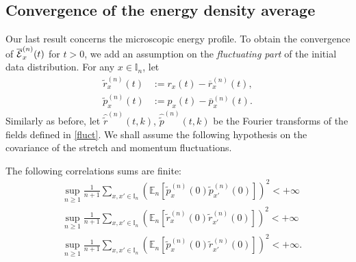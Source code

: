 \documentclass[EJP]{ejpecp} %
\newcommand\bbE{{\mathbb E}}
\newcommand\T{{\mathbb I}}
\renewcommand{\ge}{\geqslant}
\renewcommand{\tilde}{\widetilde}
\renewcommand{\bar}{\overline}
\numberwithin{equation}{section}
\begin{document}
\subsection{Convergence of the  energy density  average}
\label{sec:macr-equat}
Our last result concerns the microscopic energy profile. 
 To obtain the  convergence of $\bar{\cal
  E}_x^{(n)}(t)$ for $t>0$, we add an assumption on the
\emph{fluctuating part} of the initial data distribution.
For any $x \in \T_n$, let
\begin{equation}
\label{fluct}
\begin{aligned} \tilde r_x^{(n)}(t) &:= r_x(t)-\bar r_x^{(n)}(t),\\  \tilde p_x^{(n)}(t) &:= p_x(t)-\bar p_x^{(n)}(t).\end{aligned}
\end{equation}
Similarly as before, let  $\widehat{\tilde
  r}^{(n)}(t,k)$, $\widehat{\tilde p}^{(n)}(t,k)$ be the Fourier
transforms of the fields defined in \eqref{fluct}.
We shall assume the following hypothesis on the covariance
of the stretch and momentum fluctuations.
\begin{assumption} \label{ass3}The following correlations sums are finite:
\begin{equation}
\label{2-mfluct}
\begin{split} & \sup_{n\ge 1}\frac 1{n+1} 
\sum_{x,x'\in\T_n}\left(\mathbb E_n\left[ \tilde p_x^{(n)}(0)
  \tilde p_{x'}^{(n)}(0)\right] \right)^2   <+\infty\\
  &
\sup_{n\ge 1}\frac 1{n+1} 
\sum_{x,x'\in\T_n}\left(\mathbb E_n\left[ \tilde r_x^{(n)}(0)
  \tilde r_{x'}^{(n)}(0)\right] \right)^2  <+\infty \\
  & \sup_{n\ge 1}\frac 1{n+1} 
\sum_{x,x'\in\T_n} \left(\mathbb E_n\left[ \tilde p_x^{(n)}(0)
  \tilde r_{x'}^{(n)}(0)\right] \right)^2 <+\infty.
\end{split} \end{equation}
\end{assumption}
\end{document}

